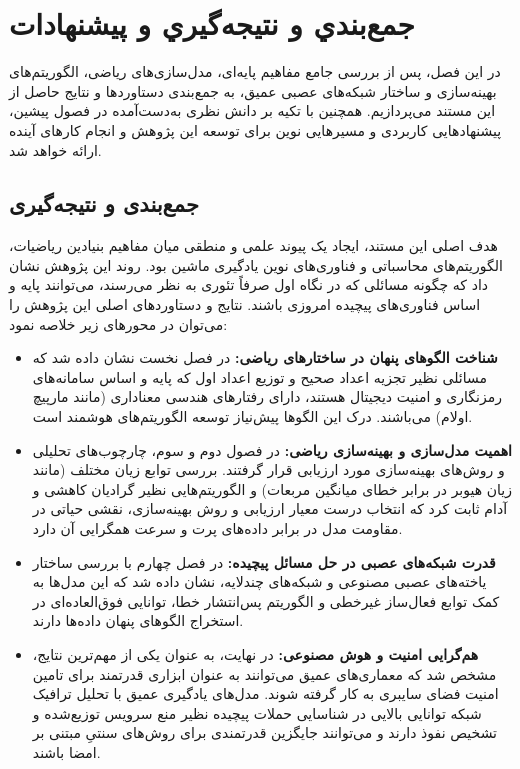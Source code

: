 \chapter{جمع‌بندي و نتيجه‌گيري و پیشنهادات}\label{chap:5}
در این فصل، پس از بررسی جامع مفاهیم پایه‌ای، مدل‌سازی‌های ریاضی، الگوریتم‌های بهینه‌سازی و ساختار شبکه‌های عصبی عمیق، به جمع‌بندی دستاوردها و نتایج حاصل از این مستند می‌پردازیم. همچنین با تکیه بر دانش نظری به‌دست‌آمده در فصول پیشین، پیشنهادهایی کاربردی و مسیرهایی نوین برای توسعه این پژوهش و انجام کارهای آینده ارائه خواهد شد.

\section{جمع‌بندی و نتیجه‌گیری}\label{sec:5-1}
هدف اصلی این مستند، ایجاد یک پیوند علمی و منطقی میان مفاهیم بنیادین ریاضیات، الگوریتم‌های محاسباتی و فناوری‌های نوین یادگیری ماشین بود. روند این پژوهش نشان داد که چگونه مسائلی که در نگاه اول صرفاً تئوری به نظر می‌رسند، می‌توانند پایه و اساس فناوری‌های پیچیده امروزی باشند. نتایج و دستاوردهای اصلی این پژوهش را می‌توان در محورهای زیر خلاصه نمود:

\begin{itemize}
	\item \textbf{شناخت الگوهای پنهان در ساختارهای ریاضی:} در فصل نخست نشان داده شد که مسائلی نظیر تجزیه اعداد صحیح و توزیع اعداد اول که پایه و اساس سامانه‌های رمزنگاری و امنیت دیجیتال هستند، دارای رفتارهای هندسی معناداری (مانند مارپیچ اولام) می‌باشند. درک این الگوها پیش‌نیاز توسعه الگوریتم‌های هوشمند است.
	
	\item \textbf{اهمیت مدل‌سازی و بهینه‌سازی ریاضی:} در فصول دوم و سوم، چارچوب‌های تحلیلی و روش‌های بهینه‌سازی مورد ارزیابی قرار گرفتند. بررسی توابع زیان مختلف (مانند زیان هیوبر در برابر خطای میانگین مربعات) و الگوریتم‌هایی نظیر گرادیان کاهشی و آدام ثابت کرد که انتخاب درست معیار ارزیابی و روش بهینه‌سازی، نقشی حیاتی در مقاومت مدل در برابر داده‌های پرت و سرعت همگرایی آن دارد.
	
	\item \textbf{قدرت شبکه‌های عصبی در حل مسائل پیچیده:} در فصل چهارم با بررسی ساختار یاخته‌های عصبی مصنوعی و شبکه‌های چندلایه، نشان داده شد که این مدل‌ها به کمک توابع فعال‌ساز غیرخطی و الگوریتم پس‌انتشار خطا، توانایی فوق‌العاده‌ای در استخراج الگوهای پنهان داده‌ها دارند. 
	
	\item \textbf{هم‌گرایی امنیت و هوش مصنوعی:} در نهایت، به عنوان یکی از مهم‌ترین نتایج، مشخص شد که معماری‌های عمیق می‌توانند به عنوان ابزاری قدرتمند برای تامین امنیت فضای سایبری به کار گرفته شوند. مدل‌های یادگیری عمیق با تحلیل ترافیک شبکه توانایی بالایی در شناسایی حملات پیچیده نظیر منع سرویس توزیع‌شده و تشخیص نفوذ دارند و می‌توانند جایگزین قدرتمندی برای روش‌های سنتیِ مبتنی بر امضا باشند.
\end{itemize}

